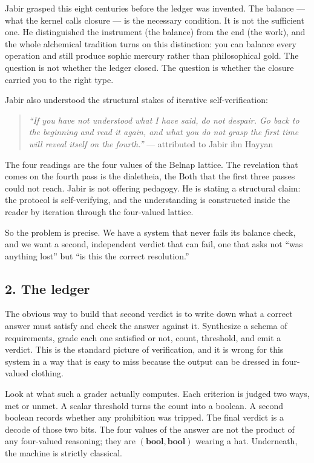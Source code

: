 Jabir grasped this eight centuries before the ledger was invented. The
balance --- what the kernel calls closure --- is the necessary
condition. It is not the sufficient one. He distinguished the instrument
(the balance) from the end (the work), and the whole alchemical
tradition turns on this distinction: you can balance every operation and
still produce sophic mercury rather than philosophical gold. The
question is not whether the ledger closed. The question is whether the
closure carried you to the right type.

Jabir also understood the structural stakes of iterative
self-verification:

\begin{quote}
\emph{``If you have not understood what I have said, do not despair. Go
back to the beginning and read it again, and what you do not grasp the
first time will reveal itself on the fourth.''} --- attributed to Jabir
ibn Hayyan
\end{quote}

The four readings are the four values of the Belnap lattice. The
revelation that comes on the fourth pass is the dialetheia, the Both
that the first three passes could not reach. Jabir is not offering
pedagogy. He is stating a structural claim: the protocol is
self-verifying, and the understanding is constructed inside the reader
by iteration through the four-valued lattice.

So the problem is precise. We have a system that never fails its balance
check, and we want a second, independent verdict that can fail, one that
asks not ``was anything lost'' but ``is this the correct resolution.''

\hypertarget{the-ledger}{%
\subsection{2. The ledger}\label{the-ledger}}

The obvious way to build that second verdict is to write down what a
correct answer must satisfy and check the answer against it. Synthesize
a schema of requirements, grade each one satisfied or not, count,
threshold, and emit a verdict. This is the standard picture of
verification, and it is wrong for this system in a way that is easy to
miss because the output can be dressed in four-valued clothing.

Look at what such a grader actually computes. Each criterion is judged
two ways, met or unmet. A scalar threshold turns the count into a
boolean. A second boolean records whether any prohibition was tripped.
The final verdict is a decode of those two bits. The four values of the
answer are not the product of any four-valued reasoning; they are
\(\mathbf{(bool, bool)}\) wearing a hat. Underneath, the machine is
strictly classical.

